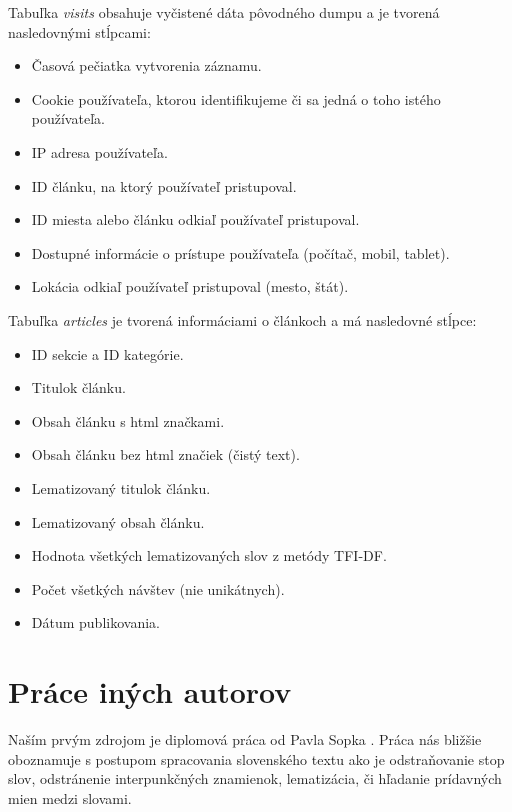 \documentclass[runningheads,a4paper]{llncs}
\begin{document}
Tabuľka {\em visits} obsahuje vyčistené dáta pôvodného dumpu a je tvorená nasledovnými stĺpcami:
\begin{itemize}
\renewcommand{\labelitemi}{$\bullet$}
  \item Časová pečiatka vytvorenia záznamu.
  \item Cookie používateľa, ktorou identifikujeme či sa jedná o toho istého používateľa.
  \item IP adresa používateľa.
  \item ID článku, na ktorý používateľ pristupoval.
  \item ID miesta alebo článku odkiaľ používateľ pristupoval.
  \item Dostupné informácie o prístupe používateľa (počítač, mobil, tablet).
  \item Lokácia odkiaľ používateľ pristupoval (mesto, štát).
\end{itemize}

Tabuľka {\em articles} je tvorená informáciami o článkoch a má nasledovné stĺpce:
\begin{itemize}
\renewcommand{\labelitemi}{$\bullet$}
  \item ID sekcie a ID kategórie.
  \item Titulok článku.
  \item Obsah článku s html značkami.
  \item Obsah článku bez html značiek (čistý text).
  \item Lematizovaný titulok článku.
  \item Lematizovaný obsah článku.
  \item Hodnota všetkých lematizovaných slov z metódy TFI-DF.
  \item Počet všetkých návštev (nie unikátnych).
  \item Dátum publikovania.
\end{itemize}

\section{Práce iných autorov}
Naším prvým zdrojom je diplomová práca od Pavla Sopka \cite{diplomovka}. 
Práca nás bližšie oboznamuje s postupom spracovania slovenského textu ako je odstraňovanie stop slov, odstránenie interpunkčných znamienok, lematizácia, či hľadanie prídavných mien medzi slovami.
\end{document}
